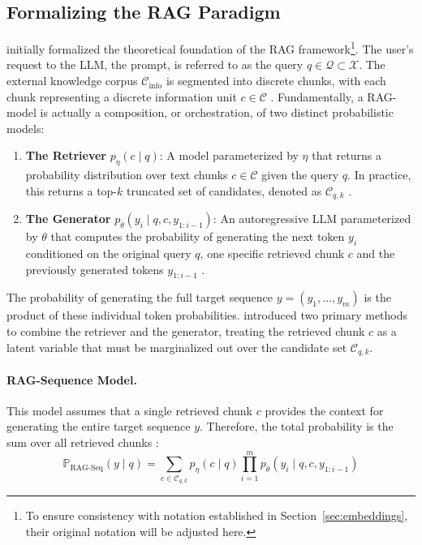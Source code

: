\subsection{Formalizing the RAG Paradigm}
\label{sec:rag_formal}

\citet{lewis_rag_2020} initially formalized the theoretical foundation of the \ac{RAG} framework\footnote{To ensure consistency with notation established in Section~\ref{sec:embeddings}, their original notation will be adjusted here.}. The user's request to the \ac{LLM}, the prompt, is referred to as the query $q \in \mathcal{Q} \subset \mathcal{X}$. The external knowledge corpus $\mathcal{C}_{\text{info}}$ is segmented into discrete chunks, with each chunk representing a discrete information unit $c \in \mathcal{C}$ \cite{Karpukhin2020_DPR, gao_2024_rag}. Fundamentally, a \ac{RAG}-model is actually a composition, or orchestration, of two distinct probabilistic models:

\begin{enumerate}
    \item \textbf{The Retriever} $p_\eta(c \mid q)$: A model parameterized by $\eta$ that returns a probability distribution over text chunks $c \in \mathcal{C}$ given the query $q$. In practice, this returns a top-$k$ truncated set of candidates, denoted as $\mathcal{C}_{q,k}$ \cite{lewis_rag_2020, Karpukhin2020_DPR}.
    \item \textbf{The Generator} $p_\theta(y_i \mid q, c, y_{1:i-1})$: An autoregressive \ac{LLM} parameterized by $\theta$ that computes the probability of generating the next token $y_i$ conditioned on the original query $q$, one specific retrieved chunk $c$ and the previously generated tokens $y_{1:i-1}$ \cite{lewis_rag_2020}. 
\end{enumerate}

The probability of generating the full target sequence $y = (y_1, \dots, y_m)$ is the product of these individual token probabilities. \citet{lewis_rag_2020} introduced two primary methods to combine the retriever and the generator, treating the retrieved chunk $c$ as a latent variable that must be marginalized out over the candidate set $\mathcal{C}_{q,k}$.

\paragraph{RAG-Sequence Model.} 
This model assumes that a single retrieved chunk $c$ provides the context for generating the entire target sequence $y$. Therefore, the total probability is the sum over all retrieved chunks \cite{lewis_rag_2020}:
\begin{equation}
    \mathbb{P}_{\text{RAG-Seq}}(y \mid q) = \sum_{c \in \mathcal{C}_{q,k}} p_\eta(c \mid q) \prod_{i=1}^m p_\theta(y_i \mid q, c, y_{1:i-1})
\end{equation}

